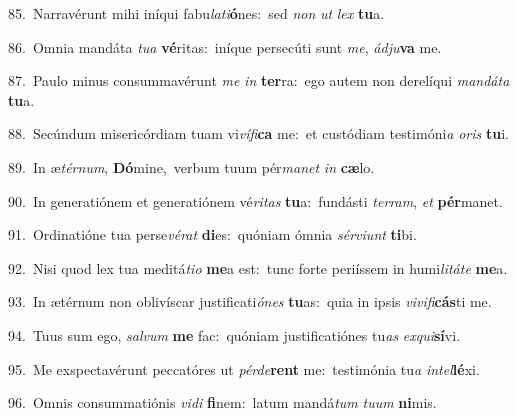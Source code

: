 {\numbfont\textcolor{\numbcolor}{85.}}~Narravérunt mihi iníqui fabu\-\textit{la}\-\textit{ti}\textbf{ó}nes:~\star sed \textit{non} \textit{ut} \textit{lex} \textbf{tu}\-a.\par
{\numbfont\textcolor{\numbcolor}{86.}}~Omnia mandáta \textit{tu}\-\textit{a} \textbf{vé}\-ritas:~\star iníque persecúti sunt \textit{me}\-, \textit{ád}\-\textit{ju}\textbf{va} me.\par
{\numbfont\textcolor{\numbcolor}{87.}}~Paulo minus consummavérunt \textit{me} \textit{in} \textbf{ter}\-ra:~\star ego autem non derelíqui \textit{man}\-\textit{dá}\textit{ta} \textbf{tu}\-a.\par
{\numbfont\textcolor{\numbcolor}{88.}}~Secúndum misericórdiam tuam vi\-\textit{ví}\-\textit{fi}\textbf{ca} me:~\star et custódiam testimóni\textit{a} \textit{o}\-\textit{ris} \textbf{tu}\-i.\par
{\numbfont\textcolor{\numbcolor}{89.}}~In æ\-\textit{tér}\-\textit{num}, \textbf{Dó}\-mine,~\star verbum tuum pér\-\textit{ma}\-\textit{net} \textit{in} \textbf{cæ}\-lo.\par
{\numbfont\textcolor{\numbcolor}{90.}}~In generatiónem et generatiónem vé\-\textit{ri}\-\textit{tas} \textbf{tu}\-a:~\star fundásti \textit{ter}\-\textit{ram}, \textit{et} \textbf{pér}\-manet.\par
{\numbfont\textcolor{\numbcolor}{91.}}~Ordinatióne tua perse\-\textit{vé}\-\textit{rat} \textbf{di}\-es:~\star quóniam ómnia \textit{sér}\-\textit{vi}\textit{unt} \textbf{ti}\-bi.\par
{\numbfont\textcolor{\numbcolor}{92.}}~Nisi quod lex tua meditá\-\textit{ti}\-\textit{o} \textbf{me}\-a est:~\star tunc forte periíssem in humi\-\textit{li}\-\textit{tá}\textit{te} \textbf{me}\-a.\par
{\numbfont\textcolor{\numbcolor}{93.}}~In ætérnum non oblivíscar justificati\-\textit{ó}\-\textit{nes} \textbf{tu}\-as:~\star quia in ipsis \textit{vi}\-\textit{vi}\textit{fi}\textbf{cás}ti me.\par
{\numbfont\textcolor{\numbcolor}{94.}}~Tuus sum ego, \textit{sal}\-\textit{vum} \textbf{me} fac:~\star quóniam justificatiónes tu\textit{as} \textit{ex}\-\textit{qui}\textbf{sí}vi.\par
{\numbfont\textcolor{\numbcolor}{95.}}~Me exspectavérunt peccatóres ut \textit{pér}\-\textit{de}\textbf{rent} me:~\star testimónia tu\textit{a} \textit{in}\-\textit{tel}\textbf{lé}xi.\par
{\numbfont\textcolor{\numbcolor}{96.}}~Omnis consummatiónis \textit{vi}\-\textit{di} \textbf{fi}\-nem:~\star latum mandá\textit{tum} \textit{tu}\-\textit{um} \textbf{ni}\-mis.\par
